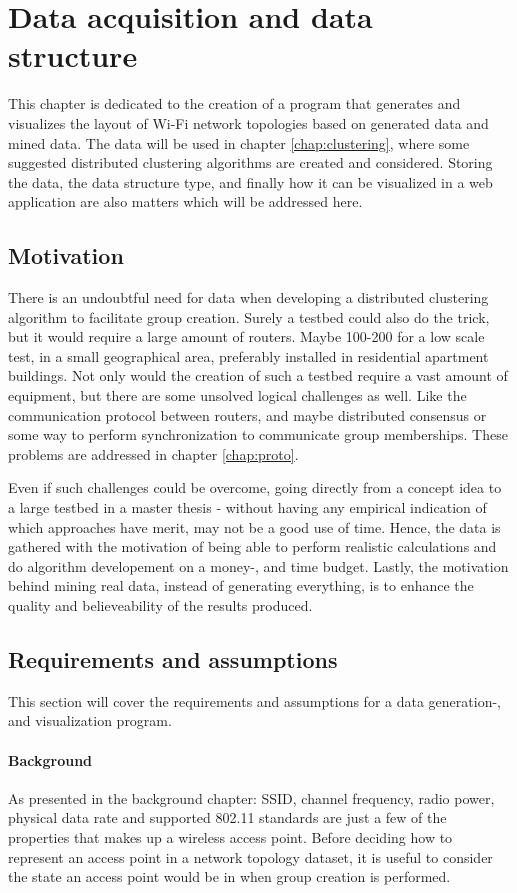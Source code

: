 \chapter{Data acquisition and data structure}\label{dataacc}
This chapter is dedicated to the creation of a program that generates and visualizes the layout of Wi-Fi network topologies based on generated data and mined data.
The data will be used in chapter \ref{chap:clustering}, where some suggested distributed clustering algorithms are created and considered. Storing the data,
the data structure type, and finally how it can be visualized in a web application are also matters which will be addressed here. 

\section{Motivation}
There is an undoubtful need for data when developing a distributed clustering algorithm to facilitate group creation.
Surely a testbed could also do the trick, but it would require a large amount of routers. Maybe 100-200 for a low scale test, in a small geographical area,
preferably installed in residential apartment buildings. Not only would the creation of such a testbed require a vast amount of equipment, but there are 
some unsolved logical challenges as well. Like the communication protocol between routers, and maybe distributed consensus or some way to perform synchronization to communicate group memberships.
These problems are addressed in chapter \ref{chap:proto}.

Even if such challenges could be overcome, going directly from a concept idea to a large testbed in a master thesis  - without having any empirical indication of which approaches have merit, may not be a good use of time. Hence, the data is gathered with the motivation of being able to perform realistic calculations and do algorithm developement on a money-, and time budget. Lastly, the motivation behind mining real data, instead of generating everything, is to enhance the quality and believeability of the results produced. 

\section{Requirements and assumptions}
This section will cover the requirements and assumptions for a data generation-, and visualization program. 

\subsubsection{Background}
As presented in the background chapter: SSID, channel frequency, radio power, physical data rate and supported 802.11 standards are just a few of the properties
that makes up a wireless access point. Before deciding how to represent an access point in a network topology dataset, it is useful to
consider the state an access point would be in when group creation is performed.  

